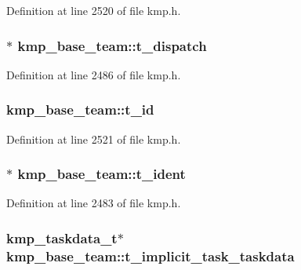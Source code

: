 Definition at line 2520 of file kmp.\-h.

\hypertarget{structkmp__base__team_ae5827b6641abfc165ff01c861a5abf4d}{
\subsubsection[{t\-\_\-dispatch}]{$\ast$ kmp\-\_\-base\-\_\-team\-::t\-\_\-dispatch}}\label{structkmp__base__team_ae5827b6641abfc165ff01c861a5abf4d}


Definition at line 2486 of file kmp.\-h.

\hypertarget{structkmp__base__team_a09eb11ddf6ce40ff7301cddc0e837275}{
\subsubsection[{t\-\_\-id}]{ kmp\-\_\-base\-\_\-team\-::t\-\_\-id}}\label{structkmp__base__team_a09eb11ddf6ce40ff7301cddc0e837275}


Definition at line 2521 of file kmp.\-h.

\hypertarget{structkmp__base__team_a77d8cd4f28068144c22cb22d148719c4}{
\subsubsection[{t\-\_\-ident}]{$\ast$ kmp\-\_\-base\-\_\-team\-::t\-\_\-ident}}\label{structkmp__base__team_a77d8cd4f28068144c22cb22d148719c4}


Definition at line 2483 of file kmp.\-h.

\hypertarget{structkmp__base__team_a4aa570739183b4aad20c1556a173a129}{
\subsubsection[{t\-\_\-implicit\-\_\-task\-\_\-taskdata}]{ {\bf kmp\-\_\-taskdata\-\_\-t}$\ast$ kmp\-\_\-base\-\_\-team\-::t\-\_\-implicit\-\_\-task\-\_\-taskdata}}\label{structkmp__base__team_a4aa570739183b4aad20c1556a173a129}


